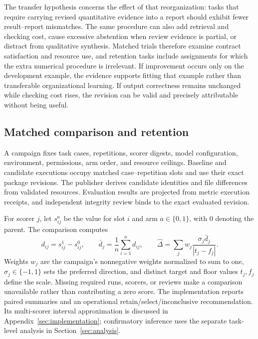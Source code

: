 The transfer hypothesis concerns the effect of that reorganization: tasks that require carrying revised quantitative evidence into a report should exhibit fewer result--report mismatches. The same procedure can also add retrieval and checking cost, cause excessive abstention when review evidence is partial, or distract from qualitative synthesis. Matched trials therefore examine contract satisfaction and resource use, and retention tasks include assignments for which the extra numerical procedure is irrelevant. If improvement occurs only on the development example, the evidence supports fitting that example rather than transferable organizational learning. If output correctness remains unchanged while checking cost rises, the revision can be valid and precisely attributable without being useful.



\subsection{Matched comparison and retention}
A campaign fixes task cases, repetitions, scorer digests, model configuration, environment, permissions, arm order, and resource ceilings. Baseline and candidate executions occupy matched case--repetition slots and use their exact package revisions. The publisher derives candidate identities and file differences from validated resources. Evaluation results are projected from metric execution receipts, and independent integrity review binds to the exact evaluated revision.

For scorer $j$, let $s_{ij}^{a}$ be the value for slot $i$ and arm $a\in\{0,1\}$, with 0 denoting the parent. The comparison computes
\begin{equation}
d_{ij}=s_{ij}^{1}-s_{ij}^{0},\qquad
\bar d_j=\frac{1}{n}\sum_{i=1}^{n}d_{ij},\qquad
\widehat\Delta=\sum_j w_j\frac{\sigma_j\bar d_j}{|t_j-f_j|}.
\label{eq:comparison}
\end{equation}
Weights $w_j$ are the campaign's nonnegative weights normalized to sum to one, $\sigma_j\in\{-1,1\}$ sets the preferred direction, and distinct target and floor values $t_j,f_j$ define the scale. Missing required runs, scorers, or reviews make a comparison unavailable rather than contributing a zero score. The implementation reports paired summaries and an operational retain/select/inconclusive recommendation. Its multi-scorer interval approximation is discussed in Appendix~\ref{sec:implementation}; confirmatory inference uses the separate task-level analysis in Section~\ref{sec:analysis}.

